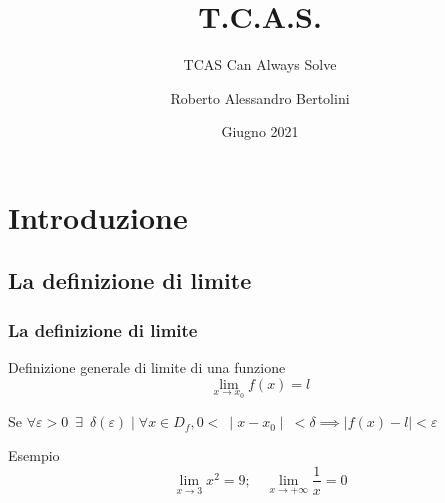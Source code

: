 \documentclass[aspectratio=149]{beamer}
\title{T.C.A.S.}
\author[Roberto Bertolini]{Roberto Alessandro Bertolini}
\institute[Liceo Nervi Ferrari]{Liceo "P. Nervi - G. Ferrari" - Morbegno}
\date{Giugno 2021}
\subtitle{TCAS Can Always Solve}
\begin{document}
	
	\begin{frame}
		\titlepage
	\end{frame}
	
	
	\section{Introduzione}
	
	\subsection{La definizione di limite}
	\begin{frame}
		\frametitle{La definizione di limite}
		\begin{block}{Definizione generale di limite di una funzione}
			\[ 
			\lim_{x \to x_{0}}{f(x) = l} 
			\]
			
			Se \( 
			\forall \varepsilon > 0 \enspace \exists \enspace \delta(\varepsilon) \mid \forall x \in D_{f}, 0 < \: \mid x - x_{0} \mid \: <\delta \implies \mid f(x) - l \mid < \varepsilon
			\)
		\end{block}
		\begin{exampleblock}{Esempio}
			\[
				\lim_{x \to 3}{x^2} = 9; \quad \lim_{x \to +\infty}{\frac{1}{x}} = 0
			\]
		\end{exampleblock}
	\end{frame}
	
\end{document}
